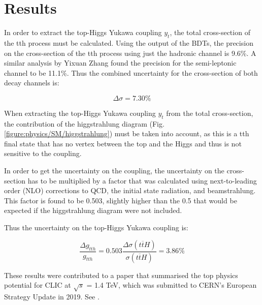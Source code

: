 


\section{Results}
In order to extract the top-Higgs Yukawa coupling $y_t$, the total cross-section of the tth process must be calculated. Using  the output of the \acrshort{BDT}s, the precision on the cross-section of the tth process using just the hadronic channel is 9.6\%. A similar analysis by Yixuan Zhang found the precision for the semi-leptonic channel to be 11.1\%. Thus the combined uncertainty for the cross-section of both decay channels is:

$$\Delta\sigma = 7.30\% $$

When extracting the top-Higgs Yukawa coupling $y_t$ from the total cross-section, the contribution of the higgstrahlung diagram (Fig. \ref{figure:physics/SM/higgstrahlung}) must be taken into account, as this is a tth final state that has no vertex between the top and the Higgs and thus is not sensitive to the coupling.

In order to get the uncertainty on the coupling, the uncertainty on the cross-section has to be multiplied by a factor that was calculated using next-to-leading order (NLO) corrections to \acrshort{QCD}, the initial state radiation, and beamstrahlung . This factor is found to be 0.503, slightly higher than the 0.5 that would be expected if the higgstrahlung diagram were not included.

Thus the uncertainty on the top-Higgs Yukawa coupling is:

$$\frac{\Delta g_{tth}}{g_{tth}} = 0.503 \frac{\Delta\sigma(t\overline{t}H)}{\sigma(t\overline{t}H)} = 3.86\% $$

These results were contributed to a paper that summarised the top physics potential for \acrshort{CLIC} at $\sqrt{s}$ = 1.4 TeV, which was submitted to \acrshort{CERN}'s European Strategy Update in 2019. See .



